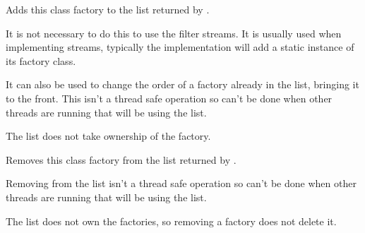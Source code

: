 
Adds this class factory to the list returned
by .

It is not necessary to do this to use the filter streams. It is usually
used when implementing streams, typically the implementation will 
add a static instance of its factory class.

It can also be used to change the order of a factory already in the list,
bringing it to the front. This isn't a thread safe operation
so can't be done when other threads are running that will be using the list.

The list does not take ownership of the factory.


\label{wxfilterclassfactoryremove}


Removes this class factory from the list returned
by .

Removing from the list isn't a thread safe operation
so can't be done when other threads are running that will be using the list.

The list does not own the factories, so removing a factory does not delete it.
